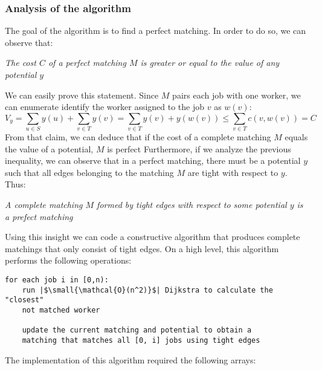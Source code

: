 \subsubsection{Analysis of the algorithm}
The goal of the algorithm is to find a perfect matching. In order to do so, we
can observe that:
\begin{center}
		\itshape
		The cost $C$ of a perfect matching $M$ is greater or equal to the value of 
		any potential $y$
\end{center}
We can easily prove this statement. Since $M$ pairs each
job with one worker, we can enumerate identify the worker assigned to 
the job $v$ as $w(v)$:
\[
		V_y = \sum_{u\in S}y(u) + \sum_{v\in T}y(v) = 
		\sum_{v\in T} y(v)+y(w(v)) \le \sum_{v\in T} c(v,w(v) )= C
\]
From that claim, we can deduce that if the cost of a complete matching $M$ 
equals the value of a potential, $M$ is perfect
Furthermore, if we analyze the previous inequality, we can observe that in a 
perfect matching, there must be a potential $y$ such that all edges 
belonging to the matching $M$ are tight with respect to $y$. Thus:
\begin{center}
		\itshape
		A complete matching $M$ formed by tight edges with respect to some 
		potential $y$ is a prefect matching
\end{center}
Using this insight we can code a constructive algorithm that produces complete
matchings that only consist of tight edges.
On a high level, this algorithm performs the following operations:
\begin{verbatim}
for each job i in [0,n):
	run |$\small{\mathcal{O}(n^2)}$| Dijkstra to calculate the "closest"
	not matched worker

	update the current matching and potential to obtain a 
	matching that matches all [0, i] jobs using tight edges
\end{verbatim}
The implementation of this algorithm required the following 
arrays:
